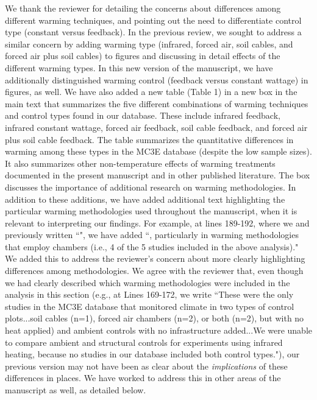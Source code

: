 \documentclass[11pt,a4paper]{letter}
\begin{document}
\begin{letter}{}
\begin{enumerate}
\begin{enumerate}
\par We thank the reviewer for detailing the concerns about differences among different warming techniques, and pointing out the need to differentiate control type (constant versus feedback). In the previous review, we sought to address a similar concern by adding warming type (infrared, forced air, soil cables, and forced air plus soil cables) to figures and discussing in detail effects of the different warming types. In this new version of the manuscript, we have additionally distinguished warming control (feedback versus constant wattage) in figures, as well. We have also added a new table (Table 1) in a new box in the main text that summarizes the five different combinations of warming techniques and control types found in our database. These include infrared feedback, infrared constant wattage, forced air feedback, soil cable feedback, and forced air plus soil cable feedback. The table summarizes the quantitative differences in warming among these types in the MC3E database (despite the low sample sizes).  It also summarizes other non-temperature effects of warming treatments documented in the present manuscript and in other published literature. The box discusses the importance of additional research on warming methodologies. In addition to these additions, we have added additional text highlighting the particular warming methodologies used throughout the manuscript, when it is relevant to interpreting our findings. For example, at lines 189-192, where we and previously written ``", we have added ``, particularly in warming methodologies that employ chambers (i.e., 4 of the 5 studies included in the above analysis)." We added this to address the reviewer's concern about more clearly highlighting differences among methodologies. We agree with the reviewer that, even though we had clearly described which warming methodologies were included in the analysis in this section (e.g., at Lines 169-172, we write ``These were the only studies in the MC3E database that monitored climate in two types of control plots...soil cables (n=1), forced air chambers (n=2), or both (n=2), but with no heat applied) and ambient controls with no infrastructure added...We were unable to compare ambient and structural controls for experiments
 using infrared heating, because no studies in our database included both control types."), our previous version may not have been as clear about the \emph{implications} of these differences in places. We have worked to address this in other areas of the manuscript as well, as detailed below.


\end{enumerate}
\end{enumerate}
\end{letter}
\end{document}
